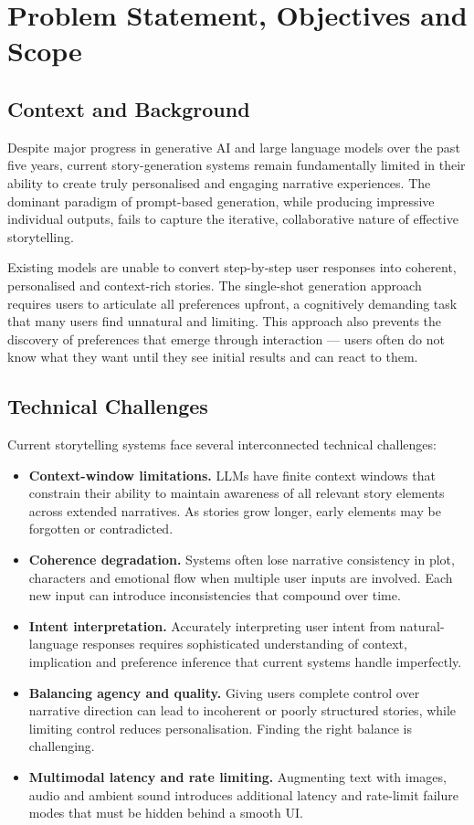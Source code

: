 \chapter{Problem Statement, Objectives and Scope}
\label{ch:problem}

\section{Context and Background}
Despite major progress in generative AI and large language models
over the past five years, current story-generation systems remain
fundamentally limited in their ability to create truly personalised
and engaging narrative experiences. The dominant paradigm of
prompt-based generation, while producing impressive individual
outputs, fails to capture the iterative, collaborative nature of
effective storytelling.

Existing models are unable to convert step-by-step user responses
into coherent, personalised and context-rich stories. The single-shot
generation approach requires users to articulate all preferences
upfront, a cognitively demanding task that many users find unnatural
and limiting. This approach also prevents the discovery of preferences
that emerge through interaction --- users often do not know what they
want until they see initial results and can react to them.

\section{Technical Challenges}
Current storytelling systems face several interconnected technical
challenges:

\begin{itemize}
    \item \textbf{Context-window limitations.} LLMs have finite
    context windows that constrain their ability to maintain
    awareness of all relevant story elements across extended
    narratives. As stories grow longer, early elements may be
    forgotten or contradicted.
    \item \textbf{Coherence degradation.} Systems often lose
    narrative consistency in plot, characters and emotional flow when
    multiple user inputs are involved. Each new input can introduce
    inconsistencies that compound over time.
    \item \textbf{Intent interpretation.} Accurately interpreting
    user intent from natural-language responses requires sophisticated
    understanding of context, implication and preference inference
    that current systems handle imperfectly.
    \item \textbf{Balancing agency and quality.} Giving users
    complete control over narrative direction can lead to incoherent
    or poorly structured stories, while limiting control reduces
    personalisation. Finding the right balance is challenging.
    \item \textbf{Multimodal latency and rate limiting.} Augmenting
    text with images, audio and ambient sound introduces additional
    latency and rate-limit failure modes that must be hidden behind a
    smooth UI.
\end{itemize}

